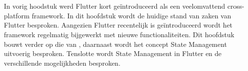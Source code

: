 \chapter{}
\label{ch:stand-van-zaken}

\newcommand\figureWidthModifier{0.6}



%
%

In vorig hoodstuk werd Flutter kort geïntroduceerd als een veelomvattend cross-platform framework. In dit hoofdstuk wordt de huidige stand van zaken van Flutter besproken. Aangezien Flutter recentelijk is geïntroduceerd wordt het framework regelmatig bijgewerkt met nieuwe functionaliteiten. Dit hoofdstuk bouwt verder op die van \autocite{Coninck2019}, daarnaast wordt het concept State Management uitvoerig besproken. Tenslotte wordt State Management in Flutter en de verschillende mogelijkheden besproken. 
\newline

